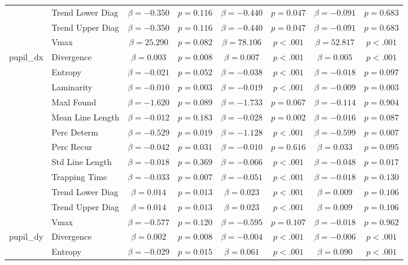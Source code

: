 \begin{tabular}{llcc|cc|cc}
 & Trend Lower Diag & $\beta = -0.350$ & $p = 0.116$ & $\beta = -0.440$ & $p = 0.047$ & $\beta = -0.091$ & $p = 0.683$ \\
 & Trend Upper Diag & $\beta = -0.350$ & $p = 0.116$ & $\beta = -0.440$ & $p = 0.047$ & $\beta = -0.091$ & $p = 0.683$ \\
 & Vmax & $\beta = 25.290$ & $p = 0.082$ & $\beta = 78.106$ & $p < .001$ & $\beta = 52.817$ & $p < .001$ \\
\midrule
\multirow{12}{*}{pupil_dx} & Divergence & $\beta = 0.003$ & $p = 0.008$ & $\beta = 0.007$ & $p < .001$ & $\beta = 0.005$ & $p < .001$ \\
 & Entropy & $\beta = -0.021$ & $p = 0.052$ & $\beta = -0.038$ & $p < .001$ & $\beta = -0.018$ & $p = 0.097$ \\
 & Laminarity & $\beta = -0.010$ & $p = 0.003$ & $\beta = -0.019$ & $p < .001$ & $\beta = -0.009$ & $p = 0.003$ \\
 & Maxl Found & $\beta = -1.620$ & $p = 0.089$ & $\beta = -1.733$ & $p = 0.067$ & $\beta = -0.114$ & $p = 0.904$ \\
 & Mean Line Length & $\beta = -0.012$ & $p = 0.183$ & $\beta = -0.028$ & $p = 0.002$ & $\beta = -0.016$ & $p = 0.087$ \\
 & Perc Determ & $\beta = -0.529$ & $p = 0.019$ & $\beta = -1.128$ & $p < .001$ & $\beta = -0.599$ & $p = 0.007$ \\
 & Perc Recur & $\beta = -0.042$ & $p = 0.031$ & $\beta = -0.010$ & $p = 0.616$ & $\beta = 0.033$ & $p = 0.095$ \\
 & Std Line Length & $\beta = -0.018$ & $p = 0.369$ & $\beta = -0.066$ & $p < .001$ & $\beta = -0.048$ & $p = 0.017$ \\
 & Trapping Time & $\beta = -0.033$ & $p = 0.007$ & $\beta = -0.051$ & $p < .001$ & $\beta = -0.018$ & $p = 0.130$ \\
 & Trend Lower Diag & $\beta = 0.014$ & $p = 0.013$ & $\beta = 0.023$ & $p < .001$ & $\beta = 0.009$ & $p = 0.106$ \\
 & Trend Upper Diag & $\beta = 0.014$ & $p = 0.013$ & $\beta = 0.023$ & $p < .001$ & $\beta = 0.009$ & $p = 0.106$ \\
 & Vmax & $\beta = -0.577$ & $p = 0.120$ & $\beta = -0.595$ & $p = 0.107$ & $\beta = -0.018$ & $p = 0.962$ \\
\midrule
\multirow{12}{*}{pupil_dy} & Divergence & $\beta = 0.002$ & $p = 0.008$ & $\beta = -0.004$ & $p < .001$ & $\beta = -0.006$ & $p < .001$ \\
 & Entropy & $\beta = -0.029$ & $p = 0.015$ & $\beta = 0.061$ & $p < .001$ & $\beta = 0.090$ & $p < .001$ \\

\end{tabular}
